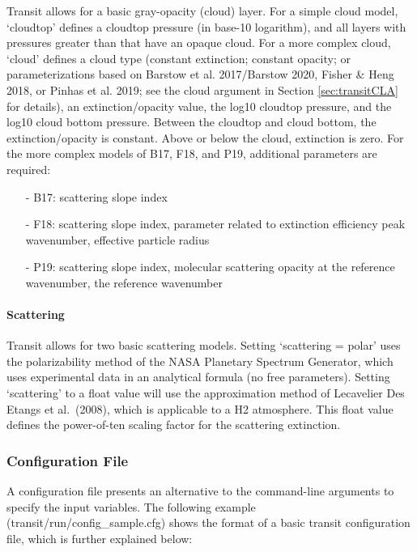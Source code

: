 \documentclass[letterpaper, 12pt]{article}
\begin{document}
Transit allows for a basic gray-opacity (cloud) layer.  For a simple 
cloud model, {\tttm `cloudtop'} defines a cloudtop pressure (in 
base-10 logarithm), and all layers with pressures greater than that 
have an opaque cloud.  For a more complex cloud, {\tttm `cloud'} defines 
a cloud type (constant extinction; constant opacity; or parameterizations 
based on Barstow et al. 2017/Barstow 2020, Fisher \& Heng 2018, or Pinhas et 
al. 2019; see the {\tttm cloud} argument in Section \ref{sec:transitCLA} for 
details), an extinction/opacity value, the log10 cloudtop pressure, 
and the log10 cloud bottom pressure.  
Between the cloudtop and cloud bottom, the extinction/opacity is constant.  
Above or below the cloud, extinction is zero.
For the more complex models of B17, F18, and P19, additional parameters are 
required:
\begin{enumerate}
\item[-] B17: scattering slope index
\item[-] F18: scattering slope index, parameter related to extinction efficiency peak wavenumber, effective particle radius
\item[-] P19: scattering slope index, molecular scattering opacity at the reference wavenumber, the reference wavenumber
\end{enumerate}

\paragraph{Scattering}

Transit allows for two basic scattering models.  Setting 
{\tttm `scattering = polar'} uses the polarizability method of the NASA 
Planetary Spectrum Generator, which uses experimental data in an analytical 
formula (no free parameters).  Setting {\tttm `scattering'} to a float value 
will use the approximation method of Lecavelier Des Etangs et al.~(2008), 
which is applicable to a H2 atmosphere.  This float value defines the 
power-of-ten scaling factor for the scattering extinction.



\subsubsection{Configuration File}
\label{sec:transitcfg}

A configuration file presents an alternative to the command-line
arguments to specify the input variables.  The following example
({\tttb transit/run/config\_sample.cfg}) shows the format of a basic
transit configuration file, which is further explained below: \newline
\end{document}
